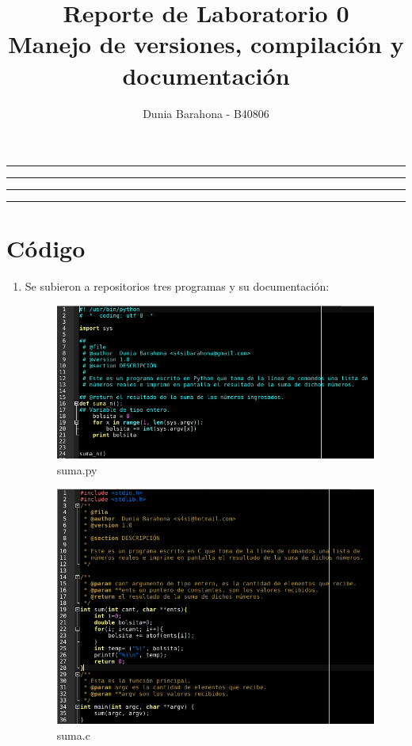 \documentclass[11pt]{article}
\title{Reporte de Laboratorio 0\\Manejo de versiones, compilación y documentación}
\author{Dunia Barahona - B40806}
\begin{document}
\maketitle
\hrule
\hrule
\tableofcontents
\hspace{5mm}
\hrule
\hrule

\section{Código}
\begin{enumerate}
	\item Se subieron a repositorios tres programas y su documentación:
	
	\begin{figure}[H]
		\centering
		\includegraphics[scale=0.6]{cdPy.png}
		\caption{suma.py}
		\label{fig:cPy}
	\end{figure}
	
	\begin{figure}[H]
		\centering
		\includegraphics[scale=0.6]{cdC.png}
		\caption{suma.c}
		\label{fig:cPy}
	\end{figure}
	

\end{enumerate}
\end{document}
